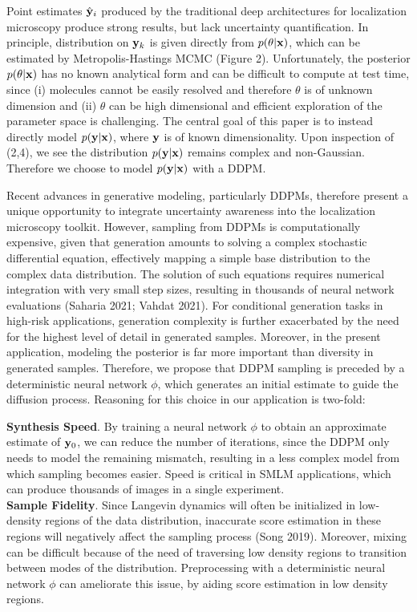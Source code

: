 \documentclass{article}
\begin{document}
Point estimates $\hat{\bold{y}}_{i}$ produced by the traditional deep architectures for localization microscopy produce strong results, but lack uncertainty quantification. In principle, distribution on $\bold{y}_{k}$ is given directly from $p(\theta|\bold{x})$, which can be estimated by Metropolis-Hastings MCMC (Figure 2). Unfortunately, the posterior $p(\theta|\bold{x})$ has no known analytical form and can be difficult to compute at test time, since (i) molecules cannot be easily resolved and therefore $\theta$ is of unknown dimension and (ii) $\theta$ can be high dimensional and efficient exploration of the parameter space is challenging. The central goal of this paper is to instead directly model $p(\bold{y}|\bold{x})$, where $\bold{y}$ is of known dimensionality. Upon inspection of (2,4), we see the distribution $p(\bold{y}|\bold{x})$ remains complex and non-Gaussian. Therefore we choose to model $p(\bold{y}|\bold{x})$ with a DDPM. 

Recent advances in generative modeling, particularly DDPMs, therefore present a unique opportunity to integrate uncertainty awareness into the localization microscopy toolkit. However, sampling from DDPMs is computationally expensive, given that generation amounts to solving a complex stochastic differential equation, effectively mapping a simple base distribution to the complex data distribution. The solution of such equations requires numerical integration with very small step sizes, resulting in thousands of neural network evaluations (Saharia 2021; Vahdat 2021). For conditional generation tasks in high-risk applications, generation complexity is further exacerbated by the need for the highest level of detail in generated samples. Moreover, in the present application, modeling the posterior is far more important than diversity in generated samples. Therefore, we propose that DDPM sampling is preceded by a deterministic neural network $\phi$, which generates an initial estimate to guide the diffusion process. Reasoning for this choice in our application is two-fold:

\textbf{Synthesis Speed}. By training a neural network $\phi$ to obtain an approximate estimate of $\bold{y}_{0}$, we can reduce the number of iterations, since the DDPM only needs to model the remaining mismatch, resulting in a less complex model from which sampling becomes easier. Speed is critical in SMLM applications, which can produce thousands of images in a single experiment.\\

\textbf{Sample Fidelity}. Since Langevin dynamics will often be initialized in low-density regions of the data distribution, inaccurate score estimation in these regions will negatively affect the sampling process (Song 2019). Moreover, mixing can be difficult because of the need of traversing low density regions to transition between modes of the distribution. Preprocessing with a deterministic neural network $\phi$ can ameliorate this issue, by aiding score estimation in low density regions. 
\end{document}
